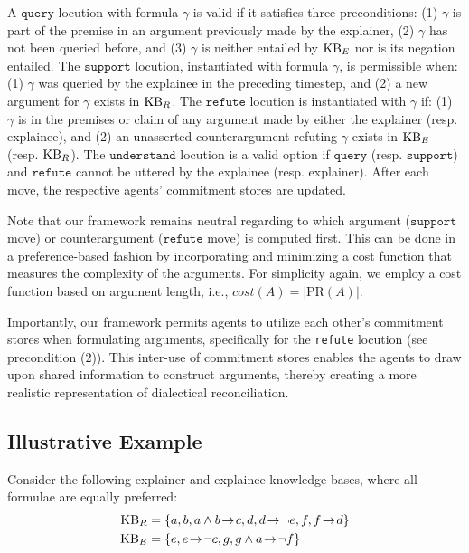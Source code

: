 \documentclass{article}
\begin{document}
A $\texttt{query}$ locution with formula $\gamma$ is valid if it satisfies three preconditions: (1) $\gamma$ is part of the premise in an argument previously made by the explainer, (2) $\gamma$ has not been queried before, and (3) $\gamma$ is neither entailed by $\mathrm{KB}_E$ nor is its negation entailed. The $\texttt{support}$ locution, instantiated with formula $\gamma$, is permissible when: (1) $\gamma$ was queried by the explainee in the preceding timestep, and (2) a new argument for $\gamma$ exists in $\mathrm{KB}_R$. The $\texttt{refute}$ locution is instantiated with $\gamma$ if: (1) $\gamma$ is in the premises or claim of any argument made by either the explainer (resp. explainee), and (2) an unasserted counterargument refuting $\gamma$ exists in $\mathrm{KB}_E$ (resp. $\mathrm{KB}_R$). The $\texttt{understand}$ locution is a valid option if $\texttt{query}$ (resp. $\texttt{support}$) and $\texttt{refute}$ cannot be uttered by the explainee (resp. explainer). After each move, the respective agents' commitment stores are updated. 


Note that our framework remains neutral regarding to which argument ($\texttt{support}$ move) or counterargument ($\texttt{refute}$ move) is computed first. This can be done in a preference-based fashion by incorporating and minimizing a cost function that measures the complexity of the arguments. For simplicity again, we employ a cost function based on argument length, i.e., $cost(A) = |\mathrm{PR}(A)|$.

 
Importantly, our framework permits agents to utilize each other's commitment stores when formulating arguments, specifically for the \texttt{refute} locution (see precondition (2)). This inter-use of commitment stores enables the agents to draw upon shared information to construct arguments, thereby creating a more realistic representation of dialectical reconciliation.
 



\subsection{Illustrative Example}
\label{example}

Consider the following explainer and explainee knowledge bases, where all formulae are equally preferred:
\begin{align*}
      \KB_R &= \{ a, b , a \land b \!\rightarrow\! c, d, d\!\rightarrow\!\neg e, f, f \!\rightarrow\! d\} \\
    \KB_E &= \{e, e \!\rightarrow\! \neg c, g, g \land a\!\rightarrow\! \neg f \}
\end{align*}
\end{document}
